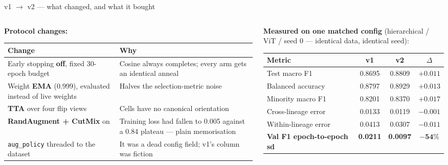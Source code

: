 \documentclass[aspectratio=169,11pt]{beamer}
\newcommand{\good}[1]{\textcolor{green!45!black}{\textbf{#1}}}
\begin{document}
\begin{frame}{v1 $\rightarrow$ v2 --- what changed, and what it bought}
  \begin{columns}[T]
    \begin{column}{0.52\textwidth}
      \scriptsize
      \textbf{Protocol changes:}
      \smallskip

      \begin{tabular}{@{}p{3.1cm}p{4.0cm}@{}}
        \toprule
        \textbf{Change} & \textbf{Why} \\
        \midrule
        Early stopping \textbf{off}, fixed 30-epoch budget & Cosine always completes; every arm gets an identical anneal \\
        \addlinespace[0.2em]
        Weight \textbf{EMA} (0.999), evaluated instead of live weights & Halves the selection-metric noise \\
        \addlinespace[0.2em]
        \textbf{TTA} over four flip views & Cells have no canonical orientation \\
        \addlinespace[0.2em]
        \textbf{RandAugment + CutMix} on & Training loss had fallen to 0.005 against a 0.84 plateau --- plain memorisation \\
        \addlinespace[0.2em]
        \texttt{aug\_policy} threaded to the dataset & It was a dead config field; v1's column was fiction \\
        \bottomrule
      \end{tabular}
    \end{column}
    \begin{column}{0.46\textwidth}
      \scriptsize
      \textbf{Measured on one matched config} (hierarchical / ViT / seed 0 ---
      identical data, identical seed):
      \smallskip

      \begin{tabular}{@{}lccc@{}}
        \toprule
        \textbf{Metric} & \textbf{v1} & \textbf{v2} & $\Delta$ \\
        \midrule
        Test macro F1        & 0.8695 & 0.8809 & \good{$+0.011$} \\
        Balanced accuracy    & 0.8797 & 0.8929 & \good{$+0.013$} \\
        Minority macro F1    & 0.8201 & 0.8370 & \good{$+0.017$} \\
        Cross-lineage error  & 0.0133 & 0.0119 & \good{$-0.001$} \\
        Within-lineage error & 0.0413 & 0.0307 & \good{$-0.011$} \\
        \midrule
        \textbf{Val F1 epoch-to-epoch sd} & \textbf{0.0211} & \textbf{0.0097} & \good{$\mathbf{-54\%}$} \\
        \bottomrule
      \end{tabular}


\end{column}
\end{columns}
\end{frame}
\end{document}
